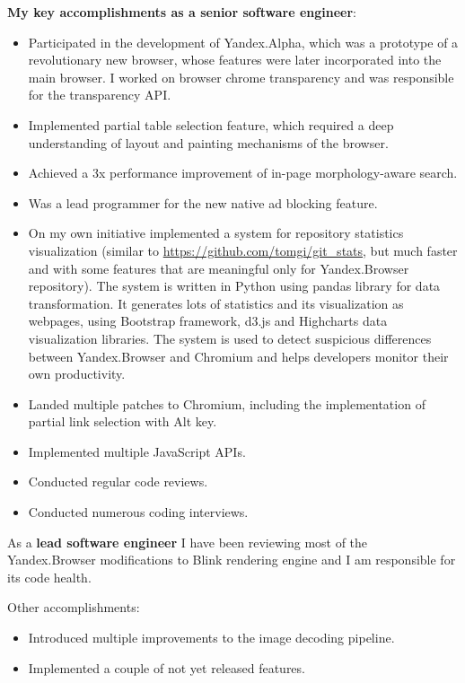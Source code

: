 \documentclass[11pt,a4paper]{moderncv}
\begin{document}
  \medskip
  \textbf{My key accomplishments as a senior software engineer}:
  \smallskip
  \begin{itemize}%
    \item Participated in the development of Yandex.Alpha, which was a prototype of a revolutionary new browser, whose features were later incorporated into the main browser.
      I worked on browser chrome transparency and was responsible for the transparency API.
    \item Implemented partial table selection feature, which required a deep understanding of layout and painting mechanisms of the browser.
    \item Achieved a 3x performance improvement of in-page morphology-aware search.
    \item Was a lead programmer for the new native ad blocking feature.
    \item On my own initiative implemented a system for repository statistics visualization (similar to \url{https://github.com/tomgi/git\_stats}, but much faster and with some features that are meaningful only for Yandex.Browser repository).
      The system is written in Python using pandas library for data transformation. It generates lots of statistics and its visualization as webpages, using Bootstrap framework, d3.js and Highcharts data visualization libraries.
      The system is used to detect suspicious differences between Yandex.Browser and Chromium and helps developers monitor their own productivity.
    \item Landed multiple patches to Chromium, including the implementation of partial link selection with Alt key.
    \item Implemented multiple JavaScript APIs.
    \item Conducted regular code reviews.
    \item Conducted numerous coding interviews.
  \end{itemize}

  \medskip
  As a \textbf{lead software engineer} I have been reviewing most of the Yandex.Browser modifications to Blink rendering engine and I am responsible for its code health.

  Other accomplishments:
  \smallskip
  \begin{itemize}%
    \item Introduced multiple improvements to the image decoding pipeline.
    \item Implemented a couple of not yet released features.
  \end{itemize}
\end{document}
